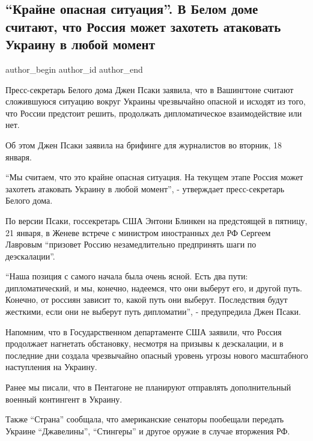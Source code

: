  
 
 
 
 
\subsection{\enquote{Крайне опасная ситуация}. В Белом доме считают, что Россия может захотеть атаковать Украину в любой момент}
\label{sec:18_01_2022.stz.news.ua.strana.1.rossia_mozhet_zahotet}

\ifcmt
 author_begin
   author_id  
 author_end
\fi

Пресс-секретарь Белого дома Джен Псаки заявила, что в Вашингтоне считают
сложившуюся ситуацию вокруг Украины чрезвычайно опасной и исходят из того, что
России предстоит решить, продолжать дипломатическое взаимодействие или нет. 

Об этом Джен Псаки заявила на брифинге для журналистов во вторник, 18 января.

\enquote{Мы считаем, что это крайне опасная ситуация. На текущем этапе Россия может
захотеть атаковать Украину в любой момент}, - утверждает пресс-секретарь Белого
дома.

По версии Псаки, госсекретарь США Энтони Блинкен на предстоящей в пятницу, 21
января, в Женеве встрече с министром иностранных дел РФ Сергеем Лавровым
\enquote{призовет Россию незамедлительно предпринять шаги по деэскалации}.

\enquote{Наша позиция с самого начала была очень ясной. Есть два пути: дипломатический,
и мы, конечно, надеемся, что они выберут его, и другой путь. Конечно, от
россиян зависит то, какой путь они выберут. Последствия будут жесткими, если
они не выберут путь дипломатии}, - предупредила Джен Псаки.

Напомним, что в Государственном департаменте США заявили, что Россия продолжает
нагнетать обстановку, несмотря на призывы к деэскалации, и в последние дни
создала чрезвычайно опасный уровень угрозы нового масштабного наступления на
Украину.

Ранее мы писали, что в Пентагоне не планируют отправлять дополнительный военный
контингент в Украину.

Также \enquote{Страна} сообщала, что американские сенаторы пообещали передать Украине
\enquote{Джавелины}, \enquote{Стингеры} и другое оружие в случае вторжения РФ.
